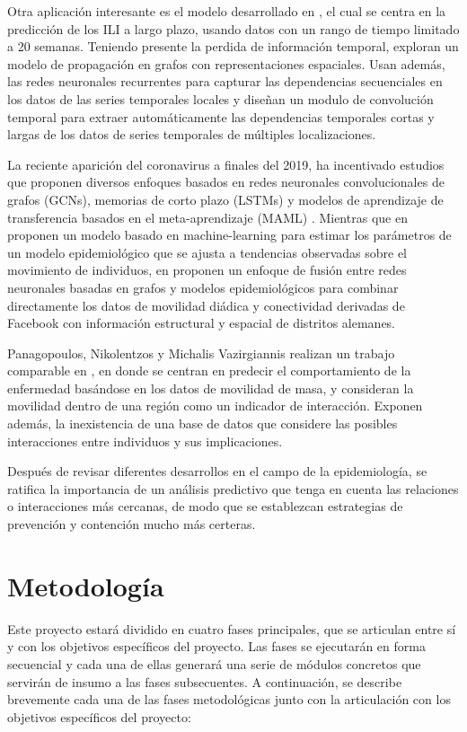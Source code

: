 \documentclass{article}
\begin{document}
Otra aplicación interesante es el modelo desarrollado en \cite{colaGNN}, el cual se centra en la predicción de los ILI a largo plazo, usando datos con un rango de tiempo limitado a 20 semanas. Teniendo presente la perdida de información temporal, exploran un modelo de propagación en grafos con representaciones espaciales. Usan además, las redes neuronales recurrentes para capturar las dependencias secuenciales en los datos de las series temporales locales y diseñan un modulo de convolución temporal para extraer automáticamente las dependencias temporales cortas y largas de los datos de series temporales de múltiples localizaciones.

La reciente aparición del coronavirus a finales del 2019, ha incentivado estudios que proponen diversos enfoques basados en redes neuronales convolucionales de grafos (GCNs), memorias de corto plazo (LSTMs) y modelos de aprendizaje de transferencia basados en el meta-aprendizaje (MAML) \cite{combiningGraph, epidemiologicalNeuralNetwork}. Mientras que en \cite{epidemiologicalNeuralNetwork} proponen un modelo basado en machine-learning para estimar los parámetros de un modelo epidemiológico que se ajusta a tendencias observadas sobre el movimiento de individuos, en \cite{combiningGraph} proponen un enfoque de fusión entre redes neuronales basadas en grafos y modelos epidemiológicos para combinar directamente los datos de movilidad diádica y conectividad derivadas de Facebook con información estructural y espacial de distritos alemanes.

Panagopoulos, Nikolentzos y Michalis Vazirgiannis realizan un trabajo comparable en \cite{transfer2021}, en donde se centran en predecir el comportamiento de la enfermedad basándose en los datos de movilidad de masa, y consideran la movilidad dentro de una región como un indicador de interacción. Exponen además, la inexistencia de una base de datos que considere las posibles interacciones entre individuos y sus implicaciones.

Después de revisar diferentes desarrollos en el campo de la epidemiología, se ratifica la importancia de un análisis predictivo que tenga en cuenta las relaciones o interacciones más cercanas, de modo que se establezcan estrategias de prevención y contención mucho más certeras.

\newpage
\section{Metodología}
Este proyecto estará dividido en cuatro fases principales, que se articulan entre sí y con los objetivos específicos del proyecto. Las fases se ejecutarán en forma secuencial y cada una de ellas generará una serie de módulos concretos que servirán de insumo a las fases subsecuentes. A continuación, se describe brevemente cada una de las fases metodológicas junto con la articulación con los objetivos específicos del proyecto:
\end{document}
